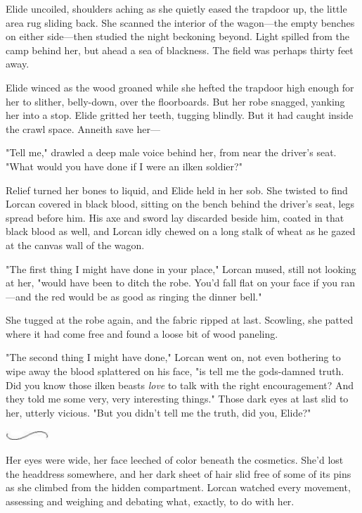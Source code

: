 Elide uncoiled, shoulders aching as she quietly eased the trapdoor up, the little area rug sliding back. She scanned the interior of the wagon---the empty benches on either side---then studied the night beckoning beyond. Light spilled from the camp behind her, but ahead
 a sea of blackness. The field was perhaps thirty feet away.

Elide winced as the wood groaned while she hefted the trapdoor high enough for her to slither, belly-down, over the floorboards. But her robe snagged, yanking her into a stop. Elide gritted her teeth, tugging blindly. But it had caught inside the crawl space. Anneith save her---

"Tell me," drawled a deep male voice behind her, from near the driver's seat. "What would you have done if I were an ilken soldier?"

Relief turned her bones to liquid, and Elide held in her sob. She twisted to find Lorcan covered in black blood, sitting on the bench behind the driver's seat, legs spread before him. His axe and sword lay discarded beside him, coated in that black blood as well, and Lorcan idly chewed on a long stalk of wheat as he gazed at the canvas wall of the wagon.

"The first thing I might have done in your place," Lorcan mused, still not looking at her, "would have been to ditch the robe. You'd fall flat on your face if you ran---and the red would be as good as ringing the dinner bell."

She tugged at the robe again, and the fabric ripped at last. Scowling, she patted where it had come free and found a loose bit of wood paneling.

"The second thing I might have done," Lorcan went on, not even bothering to wipe away the blood splattered on his face, "is tell me the gods-damned truth. Did you know those ilken beasts \emph{love} to talk with the right encouragement? And they told me some very, very interesting things." Those dark eyes at last slid to her, utterly vicious. "But you didn't tell me the truth, did you, Elide?"

\includegraphics[width=0.65in,height=0.13in]{images/seperator}

Her eyes were wide, her face leeched of color beneath the cosmetics. She'd lost the headdress somewhere, and her dark sheet of hair slid free of some of its pins as she climbed from the hidden compartment. Lorcan watched every movement, assessing and weighing and debating what, exactly, to do with her.

